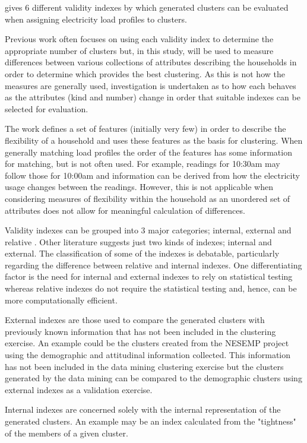 \documentclass[conference]{IEEEtran}
\begin{document}
\cite{tsekouras2008pattern} gives 6 different validity indexes by which generated clusters can be evaluated when assigning electricity load profiles to clusters. 

Previous work often focuses on using each validity index to determine the appropriate number of clusters but, in this study, will be used to measure differences between various collections of attributes describing the households in order to determine which provides the best clustering. As this is not how the measures are generally used, investigation is undertaken as to how each behaves as the attributes (kind and number) change in order that suitable indexes can be selected for evaluation.

The work defines a set of features (initially very few) in order to describe the flexibility of a household and uses these features as the basis for clustering. When generally matching load profiles the order of the features has some information for matching, but is not often used. For example, readings for 10:30am may follow those for 10:00am and information can be derived from how the electricity usage changes between the readings. However, this is not applicable when considering measures of flexibility within the household as an unordered set of attributes does not allow for meaningful calculation of differences.

Validity indexes can be grouped into 3 major categories; internal, external and relative
\cite{jain1988algorithms}. Other literature suggests just two kinds of indexes; internal and external. The classification of some of the indexes is debatable, particularly regarding the difference between relative and internal indexes. One differentiating factor is the need for internal and external indexes to rely on statistical testing whereas relative indexes do not require the statistical testing and, hence, can be more computationally efficient.

External indexes are those used to compare the generated clusters with previously known information that has not been included in the clustering exercise. An example could be the clusters created from the NESEMP project using the demographic and attitudinal information collected. This information has not been included in the data mining clustering exercise but the clusters generated by the data mining can be compared to the demographic clusters using external indexes as a validation exercise.

Internal indexes are concerned solely with the internal representation of the generated clusters. An example may be an index calculated from the "tightness" of the members of a given cluster.
\end{document}
